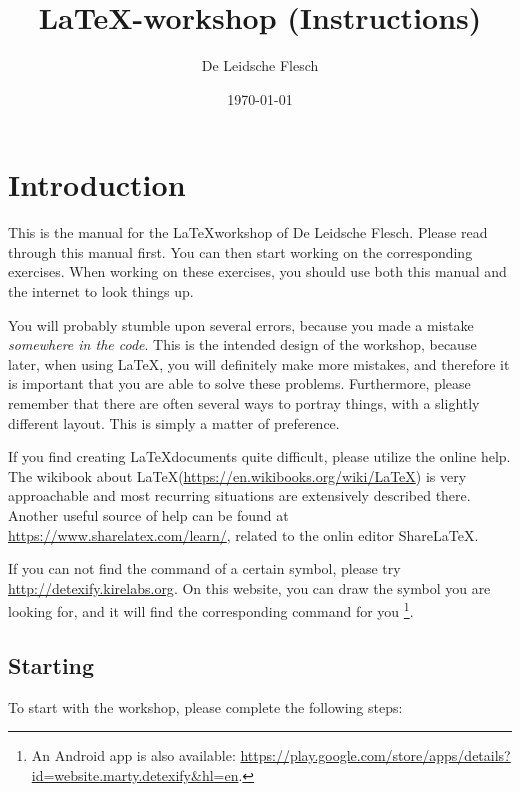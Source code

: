 \documentclass{article}
\title{\LaTeX-workshop (Instructions)}
\author{De Leidsche Flesch}
\date{\today}
\begin{document}
\maketitle
\tableofcontents
\newpage

\section{Introduction}

This is the manual for the \LaTeX workshop of De Leidsche Flesch.
Please read through this manual first. You can then start working on the corresponding exercises. 
When working on these exercises, you should use both this manual and the internet to look things up.

You will probably stumble upon several errors, because you made a mistake \emph{somewhere in the code}.
This is the intended design of the workshop, because later, when using \LaTeX, you will definitely make more mistakes,
and therefore it is important that you are able to solve these problems. Furthermore, please remember that there are often several ways to portray things, with a slightly different layout. 
This is simply a matter of preference.

If you find creating \LaTeX documents quite difficult, please utilize the online help. The wikibook about \LaTeX (\url{https://en.wikibooks.org/wiki/LaTeX}) is very approachable and most recurring situations are extensively described there. 
Another useful source of help can be found at \url{https://www.sharelatex.com/learn/}, related to the onlin editor ShareLaTeX.

If you can not find the command of a certain symbol, please try \url{http://detexify.kirelabs.org}. 
On this website, you can draw the symbol you are looking for, and it will find the corresponding command for you
\footnote{An Android app is also available: \url{https://play.google.com/store/apps/details?id=website.marty.detexify\&hl=en}.}. 

\subsection{Starting}

To start with the workshop, please complete the following steps:
\end{document}
